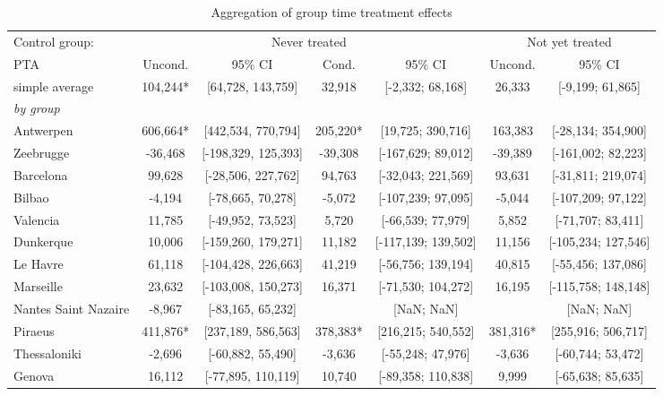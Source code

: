 \begin{table}[ht]
\centering
\caption{Aggregation of group time treatment effects} 
\begingroup\begin{adjustbox}{max width=\textwidth}
\begin{tabular}{lcccccc}
  \hline
\hline
Control group: & \multicolumn{4}{c}{Never treated} & \multicolumn{2}{c}{Not yet treated} \\
 \cmidrule(lr){2-5} \cmidrule(lr){6-7}  PTA & Uncond. & 95\% CI & Cond. & 95\% CI & Uncond. & 95\% CI  \\ 
  \hline
simple average & 104,244* & [64,728, 143,759] &   32,918 & [-2,332; 68,168] &   26,333 & [-9,199; 61,865] \\ 
   [1ex]\emph{by group} &  &  &  &  &  &  \\ 
   \hline
Antwerpen & 606,664* & [442,534, 770,794] &  205,220* & [19,725; 390,716] &  163,383 & [-28,134; 354,900] \\ 
  Zeebrugge & -36,468 & [-198,329, 125,393] &  -39,308 & [-167,629; 89,012] &  -39,389 & [-161,002; 82,223] \\ 
  Barcelona &  99,628 & [-28,506, 227,762] &   94,763 & [-32,043; 221,569] &   93,631 & [-31,811; 219,074] \\ 
  Bilbao &  -4,194 & [-78,665, 70,278] &   -5,072 & [-107,239; 97,095] &   -5,044 & [-107,209; 97,122] \\ 
  Valencia &  11,785 & [-49,952, 73,523] &    5,720 & [-66,539; 77,979] &    5,852 & [-71,707; 83,411] \\ 
  Dunkerque &  10,006 & [-159,260, 179,271] &   11,182 & [-117,139; 139,502] &   11,156 & [-105,234; 127,546] \\ 
  Le Havre &  61,118 & [-104,428, 226,663] &   41,219 & [-56,756; 139,194] &   40,815 & [-55,456; 137,086] \\ 
  Marseille &  23,632 & [-103,008, 150,273] &   16,371 & [-71,530; 104,272] &   16,195 & [-115,758; 148,148] \\ 
  Nantes Saint Nazaire &  -8,967 & [-83,165, 65,232] &  & [NaN; NaN] &  & [NaN; NaN] \\ 
  Piraeus & 411,876* & [237,189, 586,563] &  378,383* & [216,215; 540,552] &  381,316* & [255,916; 506,717] \\ 
  Thessaloniki &  -2,696 & [-60,882, 55,490] &   -3,636 & [-55,248; 47,976] &   -3,636 & [-60,744; 53,472] \\ 
  Genova &  16,112 & [-77,895, 110,119] &   10,740 & [-89,358; 110,838] &    9,999 & [-65,638; 85,635] \\ 

\end{tabular}
\end{adjustbox}
\end{table}
